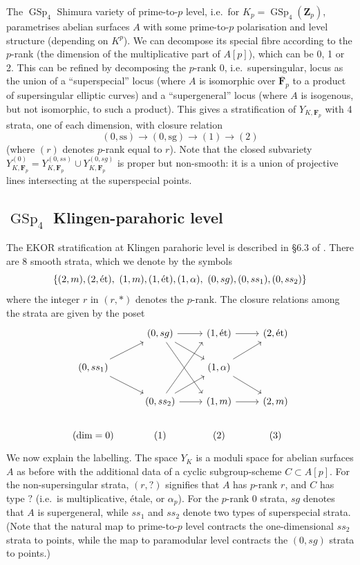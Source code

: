 \documentclass[cjm]{ipart}
\theoremstyle{plain}
\theoremstyle{remark}
\DeclareMathOperator{\GSp}{GSp}
\newcommand{\Fp}{\mathbf{F}_p}
\newcommand{\Zp}{\mathbf{Z}_p}
\newcommand{\et}{\text{\textup{\'et}}}
\numberwithin{equation}{subsection}
\begin{document}
  The $\GSp_4$ Shimura variety of prime-to-$p$ level, i.e.~for $K_p = \GSp_4(\Zp)$, parametrises abelian surfaces $A$ with some prime-to-$p$ polarisation and level structure (depending on $K^p$). We can decompose its special fibre according to the $p$-rank (the dimension of the multiplicative part of $A[p]$), which can be 0, 1 or 2. This can be refined by decomposing the $p$-rank 0, i.e.~supersingular, locus as the union of a ``superspecial'' locus (where $A$ is isomorphic over $\overline{\mathbf{F}}_p$ to a product of supersingular elliptic curves) and a ``supergeneral'' locus (where $A$ is isogenous, but not isomorphic, to such a product). This gives a stratification of $Y_{K, \Fp}$ with 4 strata, one of each dimension, with closure relation
  \[ (0, \mathrm{ss}) \longrightarrow (0, \mathrm{sg}) \longrightarrow (1) \longrightarrow (2) \]
  (where $(r)$ denotes $p$-rank equal to $r$). Note that the closed subvariety $Y_{K, \Fp}^{(0)} = Y_{K, \Fp}^{(0, ss)} \cup Y_{K, \Fp}^{(0, sg)}$ is proper but non-smooth: it is a union of projective lines intersecting at the superspecial points.

 \subsection{$\GSp_4$ Klingen-parahoric level}

  The EKOR stratification at Klingen parahoric level is described in \S 6.3 of \cite{shenyuzhang21}. There are 8 smooth strata, which we denote by the symbols
  \[ \{ (2, m), (2, \et),\ (1, m), (1, \et), (1, \alpha),\ (0, sg), (0, ss_1), (0, ss_2) \} \]
  where the integer $r$ in $(r, *)$ denotes the $p$-rank. The closure relations among the strata are given by the poset
  \[
   \begin{tikzcd}
             & (0, sg) \rar\ar[rd]\ar[rdd, end anchor=north west]& (1, \et) \rar                & (2, \et) \\
     (0, ss_1)\ar[ru]\ar[rd] & & (1, \alpha)\ar[rd] \ar[ru] & \\
             & (0, ss_2)\rar\ar[ru]\ar[ruu, end anchor=south west] & (1, m)  \rar               & (2, m)\\
     (\dim = 0) & (1) & (2) & (3)
   \end{tikzcd}
  \]
  We now explain the labelling. The space $Y_K$ is a moduli space for abelian surfaces $A$ as before with the additional data of a cyclic subgroup-scheme $C \subset A[p]$. For the non-supersingular strata, $(r, ?)$ signifies that $A$ has $p$-rank $r$, and $C$ has type $?$ (i.e.~is multiplicative, \'etale, or $\alpha_p$). For the $p$-rank 0 strata, $sg$ denotes that $A$ is supergeneral, while $ss_1$ and $ss_2$ denote two types of superspecial strata. (Note that the natural map to prime-to-$p$ level contracts the one-dimensional $ss_2$ strata to points, while the map to paramodular level contracts the $(0, sg)$ strata to points.)
\end{document}
